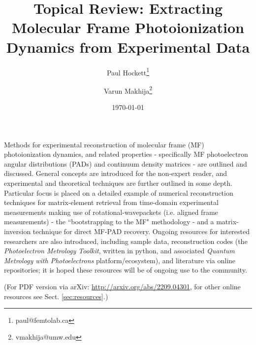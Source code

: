 \documentclass[10pt]{article}
\renewenvironment{abstract}
  {{\bfseries\noindent{\abstractname}\par\nobreak}\footnotesize}
  {\bigskip}
\begin{document}
\title{%
Topical Review: Extracting Molecular Frame Photoionization Dynamics from Experimental Data
}

\author[1]{Paul Hockett\thanks{paul@femtolab.ca} }%
\author[2]{Varun Makhija\thanks{vmakhija@umw.edu} }
%
%

\vspace{-1em}

\date{\today}


\begingroup
\let\center\flushleft
\let\endcenter\endflushleft
\maketitle
\endgroup

\begin{abstract}Methods for experimental reconstruction of molecular frame (MF) photoionization dynamics, and related properties - specifically MF photoelectron angular distributions (PADs) and continuum density matrices - are outlined and discussed. General concepts are introduced for the non-expert reader, and experimental and theoretical techniques are further outlined in some depth. Particular focus is placed on a detailed example of numerical reconstruction techniques for matrix-element retrieval from time-domain experimental measurements making use of rotational-wavepackets (i.e. aligned frame measurements) - the ``bootstrapping to the MF" methodology - and a matrix-inversion technique for direct MF-PAD recovery. Ongoing resources for interested researchers are also introduced, including sample data, reconstruction codes (the \textit{Photoelectron Metrology Toolkit}, written in python, and associated \textit{Quantum Metrology with Photoelectrons} platform/ecosystem), and literature via online repositories; it is hoped these resources will be of ongoing use to the community.\end{abstract}
\tableofcontents

(For PDF version via arXiv: \href{http://arxiv.org/abs/2209.04301}{http://arxiv.org/abs/2209.04301}, for other online resources see Sect. \ref{sec:resources}.)

\end{document}
